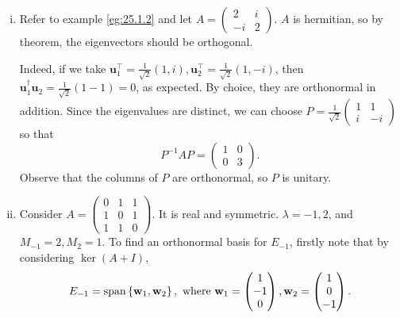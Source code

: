 \documentclass[a4paper]{article}
\begin{document}
    \begin{example}
      \begin{enumerate}[(i)]
        \item Refer to example \ref{eg:25.1.2} and let $ A =
          \begin{pmatrix}
            2&i\\-i&2
          \end{pmatrix} $. $A$ is hermitian, so by theorem, the
          eigenvectors should be orthogonal.

          Indeed, if we take $
          \mathbf{u}_1^{\top}=\frac{1}{\sqrt{2}}(1,i),
          \mathbf{u}_2^{\top}=\frac{1}{\sqrt{2}}(1,-i) $, then $
          \mathbf{u}_1^\dagger \mathbf{u}_2=\frac{1}{\sqrt{2}}(1-1)=0
          $, as expected. By choice, they are orthonormal in
          addition. Since the eigenvalues are distinct, we can choose
          $ \displaystyle P = \frac{1}{\sqrt{2}}
          \begin{pmatrix}
            1&1\\i&-i
          \end{pmatrix} $ so that
          \[
            P^{-1}AP=
            \begin{pmatrix}
              1&0\\
              0&3
            \end{pmatrix}.
          \]
          Observe that the columns of $P$ are orthonormal, so $P$ is unitary.
        \item Consider $ A =
          \begin{pmatrix}
            0&1&1\\
            1&0&1\\
            1&1&0
          \end{pmatrix} $. It is real and symmetric. $ \lambda=-1,2
          $, and $ M_{-1}=2, M_{2}=1 $. To find an orthonormal basis
          for $ E_{-1} $, firstly note that by considering $ \ker (A+I) $,
          \[
            E_{-1}=\operatorname{span}\left\{ \mathbf{w}_1,\mathbf{w}_2 \right\},
            \text{ where } \mathbf{w}_1=
            \begin{pmatrix}
              1\\-1\\0
            \end{pmatrix}, \mathbf{w}_2=
            \begin{pmatrix}
              1\\0\\-1
            \end{pmatrix}.
\]
\end{enumerate}
\end{example}
\end{document}
